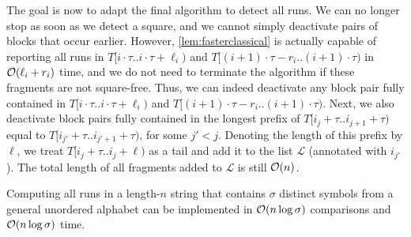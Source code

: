 The goal is now to adapt the final algorithm to detect all runs. We can no longer stop as soon as we detect a square, and we cannot
simply deactivate pairs of blocks that occur earlier. However, \cref{lem:fasterclassical} is actually capable of reporting all runs in
$T[i\cdot \tau.. i\cdot \tau+\ell_{i})$ and $T[(i+1)\cdot \tau-r_{i} .. (i+1)\cdot \tau)$ in $\mathcal{O}(\ell_{i}+r_{i})$ time, and we
do not need to terminate the algorithm if these fragments are not square-free.
Thus, we can indeed deactivate any block pair fully contained in $T[i\cdot \tau.. i\cdot \tau+\ell_{i})$ and $T[(i+1)\cdot \tau-r_{i} .. (i+1)\cdot \tau)$.
Next, we also deactivate block pairs fully contained in the longest prefix of $T[i_{j}+\tau.. i_{j+1}+\tau)$ equal to
$T[i_{j'}+\tau.. i_{j'+1}+\tau)$, for some $j'<j$. Denoting the length of this prefix by $\ell$,
we treat $T[i_{j}+\tau.. i_{j}+\ell)$ as a tail and add it to the list $\mathcal{L}$ (annotated with $i_{j'}$).
The total length of all fragments added to $\mathcal{L}$ is still $\mathcal{O}(n)$.

\begin{theorem}
\label{thm:runs}
Computing all runs in a length-$n$ string that contains $\sigma$ distinct symbols from a general unordered alphabet can be implemented in $\mathcal{O}(n\log \sigma)$ comparisons and $\mathcal{O}(n\log \sigma)$ time.
\end{theorem}
